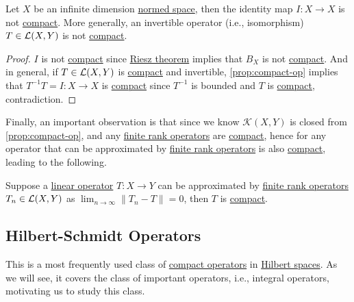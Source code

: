 \begin{corollary}\label{col:iso-are-not-compact}
	Let \(X\) be an infinite dimension \hyperref[def:normed-vector-space]{normed space}, then the identity map \(I\colon X\to X\) is not \hyperref[def:compact-op]{compact}. More generally, an invertible operator (i.e., isomorphism) \(T\in \mathcal{\MakeUppercase{l}} (X, Y)\) is not \hyperref[def:compact-op]{compact}.
\end{corollary}
\begin{proof}
	\(I\) is not \hyperref[def:compact-op]{compact} since \hyperref[thm:Riesz]{Riesz theorem} implies that \(B_X\) is not \hyperref[def:compact]{compact}. And in general, if \(T\in \mathcal{\MakeUppercase{l}} (X, Y)\) is \hyperref[def:compact-op]{compact} and invertible, \autoref{prop:compact-op} implies that \(T^{-1} T = I\colon X\to X\) is \hyperref[def:compact-op]{compact} since \(T^{-1} \) is bounded and \(T\) is \hyperref[def:compact-op]{compact}, contradiction.
\end{proof}

Finally, an important observation is that since we know \(\mathcal{K}(X, Y)\) is closed from \autoref{prop:compact-op}, and any \hyperref[rmk:finite-rank-op]{finite rank operators} are \hyperref[def:compact-op]{compact}, hence for any operator that can be approximated by \hyperref[rmk:finite-rank-op]{finite rank operators} is also \hyperref[def:compact-op]{compact}, leading to the following.

\begin{corollary}\label{col:almost-finite-rank-op-are-compact}
	Suppose a \hyperref[def:linear-map]{linear operator} \(T\colon X\to Y\) can be approximated by \hyperref[rmk:finite-rank-op]{finite rank operators} \(T_{n} \in \mathcal{\MakeUppercase{l}} (X, Y)\) as \(\lim_{n \to \infty} \lVert T_{n} - T \rVert = 0\), then \(T\) is \hyperref[def:compact-op]{compact}.
\end{corollary}

\subsection{Hilbert-Schmidt Operators}
This is a most frequently used class of \hyperref[def:compact-op]{compact operators} in \hyperref[def:Hilbert-space]{Hilbert spaces}. As we will see, it covers the class of important operators, i.e., integral operators, motivating us to study this class.

